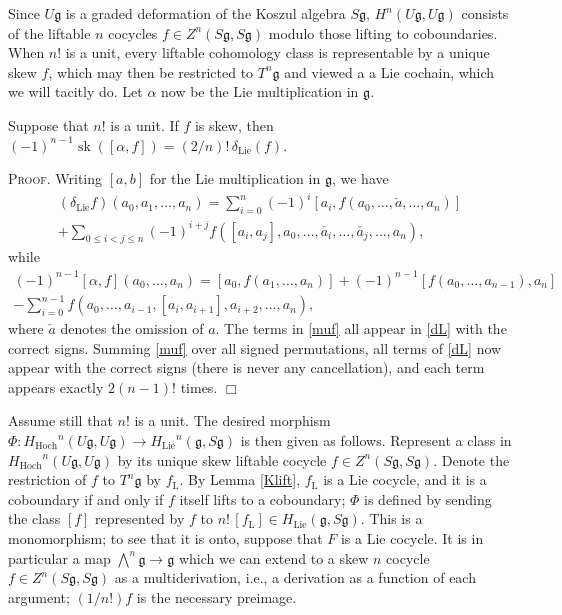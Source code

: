 \documentclass{amsart}
\begin{document}
Since $U{\mathfrak{g}}$ is a graded deformation of the Koszul algebra $S{\mathfrak{g}}$, $H^n(U{\mathfrak{g}},U{\mathfrak{g}})$ consists of the liftable $n$ cocycles $f \in Z^n(S{\mathfrak{g}}, S{\mathfrak{g}})$ modulo those lifting to coboundaries. When $n!$ is a unit, every liftable cohomology class is representable by a unique skew $f$, which may then be restricted to $T^n{\mathfrak{g}}$ and viewed a a Lie cochain, which we will tacitly do. Let $\alpha$ now be the Lie multiplication in ${\mathfrak{g}}$. 
\begin{lemma}\label{sk}
Suppose that $n!$ is a unit. If $f$ is skew, then $(-1)^{n-1}{\operatorname{sk}}([\alpha,f]) = (2/n)!\,{\ensuremath{\delta_{\text{Lie}}}}(f)$.
\end{lemma}
\noindent\textsc{Proof.} 
Writing $[a,b]$ for the Lie multiplication in ${\mathfrak{g}}$, we have 
\begin{multline}\label{dL}
({\ensuremath{\delta_{\text{Lie}}}} f)(a_0,a_1,\dots,a_n) = \sum_{i=0}^n (-1)^i[a_i, f(a_0,\dots, \check{a}, \dots, a_n)]\\ +\sum_{0 \le i < j \le n}(-1)^{i+j}f([a_i,a_j],a_0,\dots,\check{a_i}, \dots, \check{a_j},\dots, a_n), 
\end{multline}
while
\begin{multline}\label{muf}
(-1)^{n-1}[\alpha,f](a_0,\dots, a_n) =[a_0, f(a_1, \dots, a_n)] +(-1)^{n-1} [f(a_0,\dots,a_{n-1}), a_n] \\ -\sum_{i=0}^{n-1}f(a_0, \dots, a_{i-1}, [a_i, a_{i+1}], a_{i+2}, \dots, a_n),
\end{multline}
where $\check{a}$ denotes the omission of $a$.  The terms in \eqref{muf} all appear in \eqref{dL} with the correct signs. Summing \eqref{muf} over all signed permutations,  all terms of \eqref{dL} now appear with the correct signs (there is never any cancellation), and each term appears exactly $2(n-1)!$ times. 
$\Box$\medskip

Assume still that $n!$ is a unit. The desired morphism $\Phi:{\ensuremath{H_{\text{Hoch}}}}^n(U{\mathfrak{g}},U{\mathfrak{g}}) \to {\ensuremath{H_{\text{Lie}}}}^n({\mathfrak{g}}, S{\mathfrak{g}})$ is then given as follows. Represent a class in ${\ensuremath{H_{\text{Hoch}}}}^n(U{\mathfrak{g}},U{\mathfrak{g}})$  by its unique skew liftable cocycle  $f \in Z^n(S{\mathfrak{g}}, S{\mathfrak{g}})$. Denote the restriction of $f$ to $T^n{\mathfrak{g}}$ by $f_{\text{L}}$. By Lemma \ref{Klift},  $f_{\text{L}}$ is a Lie cocycle, and it is a coboundary if and only if $f$ itself lifts to a coboundary; $\Phi$ is defined by sending the class $[f]$ represented by $f$ to $n!\,[f_{\text{L}}]  \in {\ensuremath{H_{\text{Lie}}}}({\mathfrak{g}}, S{\mathfrak{g}})$.  This is a monomorphism; to see that it is onto, suppose that $F$ is a Lie cocycle.  It is in particular a map $\bigwedge^n{\mathfrak{g}} \to {\mathfrak{g}}$ which we can extend to a skew $n$ cocycle $f \in Z^n(S{\mathfrak{g}}, S{\mathfrak{g}})$ as a multiderivation, i.e., a derivation as a function of each argument; $(1/n!)f$ is the necessary preimage.  
\end{document}
